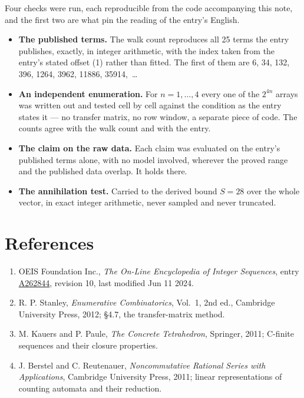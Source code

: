 \documentclass[11pt]{article}
\theoremstyle{definition}
\begin{document}
Four checks were run, each reproducible from the code accompanying this note, and the first two are what pin the reading of the entry's English.

\begin{itemize}

\item {\bfseries The published terms.} The walk count reproduces all 25 terms the entry publishes, exactly, in integer arithmetic, with the index taken from the entry's stated offset (1) rather than fitted. The first of them are 6, 34, 132, 396, 1264, 3962, 11886, 35914,~\dots

\item {\bfseries An independent enumeration.} For $n = 1,\dots,4$ every one of the $2^{4n}$ arrays was written out and tested cell by cell against the condition as the entry states it --- no transfer matrix, no row window, a separate piece of code. The counts agree with the walk count and with the entry.

\item {\bfseries The claim on the raw data.} Each claim was evaluated on the entry's published terms alone, with no model involved, wherever the proved range and the published data overlap. It holds there.

\item {\bfseries The annihilation test.} Carried to the derived bound $S = 28$ over the whole vector, in exact integer arithmetic, never sampled and never truncated.

\end{itemize}

\section{References}

\begin{enumerate}

\item OEIS Foundation Inc., \emph{The On-Line Encyclopedia of Integer Sequences}, entry \href{https://oeis.org/A262844}{A262844}, revision 10, last modified Jun 11 2024.

\item R. P. Stanley, \emph{Enumerative Combinatorics}, Vol.~1, 2nd ed., Cambridge University Press, 2012; \S4.7, the transfer-matrix method.

\item M. Kauers and P. Paule, \emph{The Concrete Tetrahedron}, Springer, 2011; C-finite sequences and their closure properties.

\item J. Berstel and C. Reutenauer, \emph{Noncommutative Rational Series with Applications}, Cambridge University Press, 2011; linear representations of counting automata and their reduction.

\end{enumerate}
\end{document}
